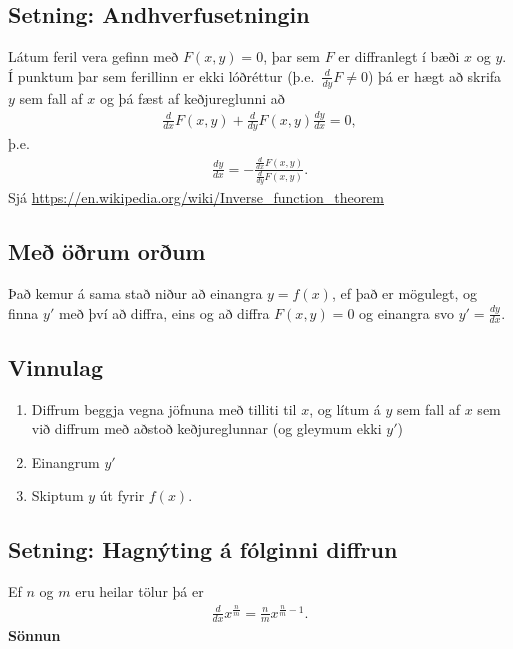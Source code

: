 \documentclass[a4paper,10pt,icelandic]{sphinxmanual}
\begin{document}
\subsection{Setning: Andhverfusetningin}
\label{kafli03:setning-andhverfusetningin}
Látum feril vera gefinn með \(F(x,y) =0\), þar sem \(F\) er
diffranlegt í bæði \(x\) og \(y\). Í punktum þar sem ferillinn
er ekki lóðréttur (þ.e. \(\frac{d}{dy}F \neq 0\)) þá er hægt að
skrifa \(y\) sem fall af \(x\) og þá fæst af keðjureglunni að
\begin{equation*}
\begin{split}\frac{d}{dx} F(x,y) + \frac{d}{dy}F(x,y) \frac{dy}{dx} = 0,\end{split}
\end{equation*}
þ.e.
\begin{equation*}
\begin{split}\frac{dy}{dx} = -\frac{\frac{d}{dx} F(x,y)}{\frac{d}{dy} F(x,y)}.\end{split}
\end{equation*}
Sjá \url{https://en.wikipedia.org/wiki/Inverse\_function\_theorem}


\subsection{Með öðrum orðum}
\label{kafli03:me-orum-orum}
Það kemur á sama stað niður að einangra \(y=f(x)\), ef það er
mögulegt, og finna \(y'\) með því að diffra, eins og að diffra
\(F(x,y)=0\) og einangra svo \(y'=\frac{dy}{dx}\).


\subsection{Vinnulag}
\label{kafli03:vinnulag}\begin{enumerate}
\item {} 
Diffrum beggja vegna jöfnuna með tilliti til \(x\), og lítum á
\(y\) sem fall af \(x\) sem við diffrum með aðstoð
keðjureglunnar (og gleymum ekki \(y'\))

\item {} 
Einangrum \(y'\)

\item {} 
Skiptum \(y\) út fyrir \(f(x)\).

\end{enumerate}


\subsection{Setning: Hagnýting á fólginni diffrun}
\label{kafli03:setning-hagnyting-a-folginni-diffrun}
Ef \(n\) og \(m\) eru heilar tölur þá er
\begin{equation*}
\begin{split}\frac{d}{dx} x^{\frac nm} = \frac nm x^{\frac nm -1}.\end{split}
\end{equation*}
\textbf{Sönnun}
\end{document}
